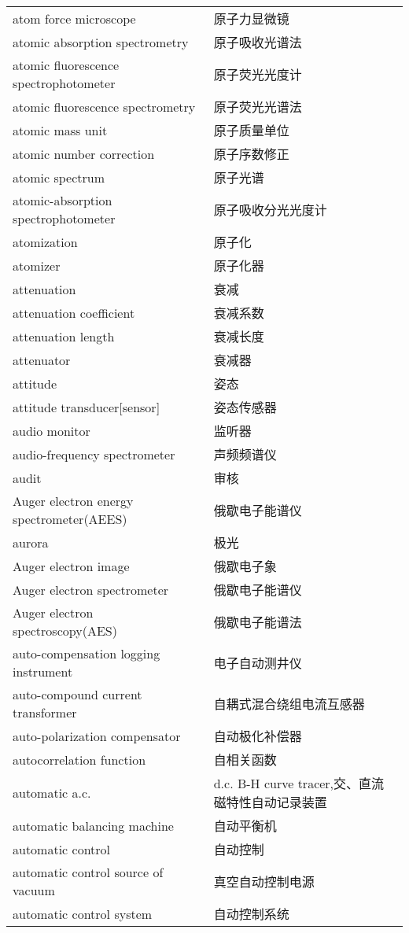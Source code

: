 \documentclass[
]{article}
\begin{document}
\begin{longtable}[]{@{}ll@{}}
atom force microscope & 原子力显微镜 \\
atomic absorption spectrometry & 原子吸收光谱法 \\
atomic fluorescence spectrophotometer & 原子荧光光度计 \\
atomic fluorescence spectrometry & 原子荧光光谱法 \\
atomic mass unit & 原子质量单位 \\
atomic number correction & 原子序数修正 \\
atomic spectrum & 原子光谱 \\
atomic-absorption spectrophotometer & 原子吸收分光光度计 \\
atomization & 原子化 \\
atomizer & 原子化器 \\
attenuation & 衰减 \\
attenuation coefficient & 衰减系数 \\
attenuation length & 衰减长度 \\
attenuator & 衰减器 \\
attitude & 姿态 \\
attitude transducer{[}sensor{]} & 姿态传感器 \\
audio monitor & 监听器 \\
audio-frequency spectrometer & 声频频谱仪 \\
audit & 审核 \\
Auger electron energy spectrometer(AEES) & 俄歇电子能谱仪 \\
aurora & 极光 \\
Auger electron image & 俄歇电子象 \\
Auger electron spectrometer & 俄歇电子能谱仪 \\
Auger electron spectroscopy(AES) & 俄歇电子能谱法 \\
auto-compensation logging instrument & 电子自动测井仪 \\
auto-compound current transformer & 自耦式混合绕组电流互感器 \\
auto-polarization compensator & 自动极化补偿器 \\
autocorrelation function & 自相关函数 \\
automatic a.c. & d.c. B-H curve tracer,交、直流磁特性自动记录装置 \\
automatic balancing machine & 自动平衡机 \\
automatic control & 自动控制 \\
automatic control source of vacuum & 真空自动控制电源 \\
automatic control system & 自动控制系统 \\

\end{longtable}
\end{document}
